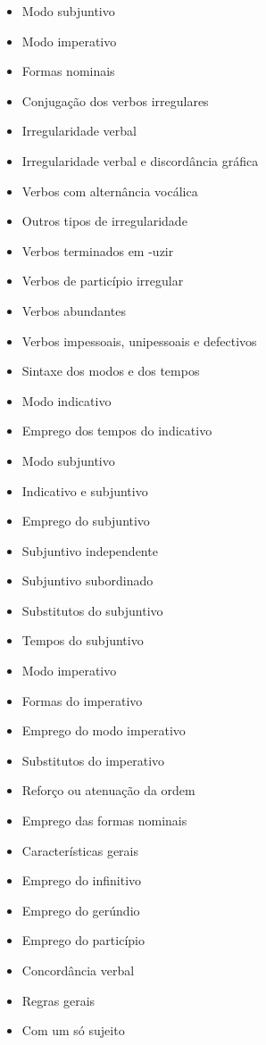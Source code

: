 \documentclass[a4paper,12pt]{article}[abntex2]
\begin{document}
\begin{itemize}
    \item Modo subjuntivo
    \item Modo imperativo
    \item Formas nominais
    \item Conjugação dos verbos irregulares
    \item Irregularidade verbal
    \item Irregularidade verbal e discordância gráfica
    \item Verbos com alternância vocálica
    \item Outros tipos de irregularidade
    \item Verbos terminados em -uzir
    \item Verbos de particípio irregular
    \item Verbos abundantes
    \item Verbos impessoais, unipessoais e defectivos
    \item Sintaxe dos modos e dos tempos
    \item Modo indicativo
    \item Emprego dos tempos do indicativo
    \item Modo subjuntivo
    \item Indicativo e subjuntivo
    \item Emprego do subjuntivo
    \item Subjuntivo independente
    \item Subjuntivo subordinado
    \item Substitutos do subjuntivo
    \item Tempos do subjuntivo
    \item Modo imperativo
    \item Formas do imperativo
    \item Emprego do modo imperativo
    \item Substitutos do imperativo
    \item Reforço ou atenuação da ordem
    \item Emprego das formas nominais
    \item Características gerais
    \item Emprego do infinitivo
    \item Emprego do gerúndio
    \item Emprego do particípio
    \item Concordância verbal
    \item Regras gerais
    \item Com um só sujeito

\end{itemize}
\end{document}

